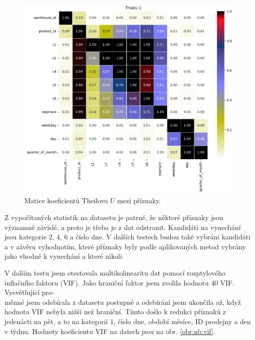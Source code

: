 \begin{figure}[hbtp!]
    \centering
    \includegraphics[width=.8\textwidth]{obrazky/zntb/theils_u.png}
    \caption{Matice koeficientů Theilovo $U$ mezi příznaky.}
    \label{obr:nb:thiels}
\end{figure}

Z vypočítaných statistik na datasetu je patrné, že některé příznaky jsou významně závislé, a proto je třeba je z dat odstranit. Kandidáti na vynechání jsou kategorie 2, 4, 6 a číslo dne. V dalších testech budou také vybráni kandidáti a v závěru vyhodnotím, které příznaky byly podle aplikovaných metod vybrány jako vhodné k vynechání a které nikoli.

V dalším testu jsem otestovala multikolinearitu dat pomocí rozptylového inflačního faktoru (VIF). Jako hraniční faktor jsem zvolila hodnotu 40 VIF. %
Vysvětlující pro-\\měnné jsem odebírala z datasetu postupně a odebírání jsem ukončila až, když hodnota VIF nebyla nižší než hraniční.
Tímto došlo k redukci příznaků z jedenácti na pět, a to na kategorii 1, číslo dne, období měsíce, ID prodejny a den v týdnu. Hodnoty koeficientu VIF na datech jsou na obr. \ref*{obr:nb:vif}. 

